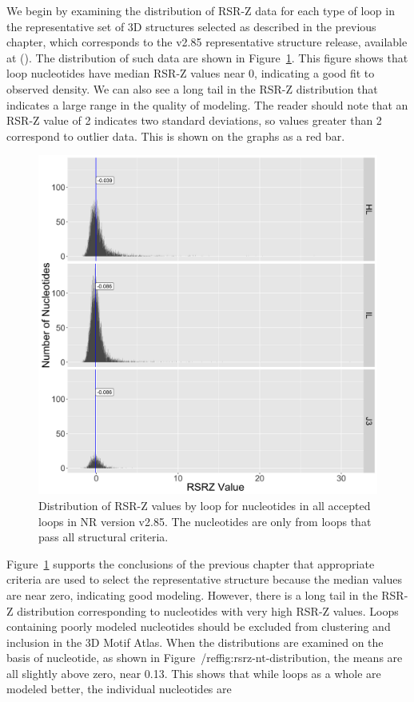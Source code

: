 We begin by examining the distribution of RSR-Z data for each type of loop in the
representative set of 3D structures selected as described in the previous
chapter, which corresponds to the v2.85 representative structure release,
available at (). The
distribution of such data are shown in Figure~\ref{fig:rsrz-distribution}. This
figure shows that loop nucleotides have median RSR-Z values near 0, indicating a
good fit to observed density. We can also see a long tail in the RSR-Z
distribution that indicates a large range in the quality of modeling. The reader
should note that an RSR-Z value of 2 indicates two standard deviations, so
values greater than 2 correspond to outlier data. This is shown on the graphs as
a red bar.

\begin{figure}
  \includegraphics[width=0.5\linewidth]{chapter-5/figs/loops/rsrz-distribution}
  \caption{Distribution of RSR-Z values by loop for nucleotides in all accepted
  loops in NR version v2.85. The nucleotides are only from loops that pass all
  structural criteria.}
  \label{fig:rsrz-distribution}
\end{figure}

Figure~\ref{fig:rsrz-distribution} supports the conclusions of the previous
chapter that appropriate criteria are used to select the representative
structure because the median values are near zero, indicating good modeling.
However, there is a long tail in the RSR-Z distribution corresponding to
nucleotides with very high RSR-Z values. Loops containing poorly modeled
nucleotides should be excluded from clustering and inclusion in the 3D Motif
Atlas. When the distributions are examined on the basis of nucleotide, as shown
in Figure~/ref{fig:rsrz-nt-distribution}, the means are all slightly above zero,
near 0.13. This shows that while loops as a whole are modeled better, the
individual nucleotides are 

